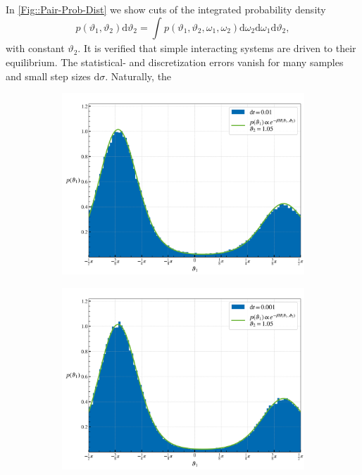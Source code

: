 	In \autoref{Fig::Pair-Prob-Dist} we show cuts of the integrated probability density 
	\begin{equation}
		p(\vartheta_1, \vartheta_2) \text{d}\vartheta_2 =	\int_{} p(\vartheta_1, \vartheta_2, \omega_1, \omega_2) \text{d}\omega_2 \text{d}\omega_1\text{d}\vartheta_2,
	\end{equation}
	 with constant $\vartheta_2$. It is verified that simple interacting systems are driven to their equilibrium. The statistical- and discretization errors vanish for many samples and small step sizes $\text{d}\sigma$. Naturally, the 
	
	\begin{figure}[htp]
		\begin{subfigure}{0.5\textwidth}
			\centering
			\includegraphics[width=0.8\linewidth]{graphics/eq-dist-0.01.png}
		\end{subfigure}
		\begin{subfigure}{0.5\textwidth}
			\centering
			\includegraphics[width=0.8\linewidth]{graphics/eq-dist-0.001.png}
		\end{subfigure} \\

\end{figure}
